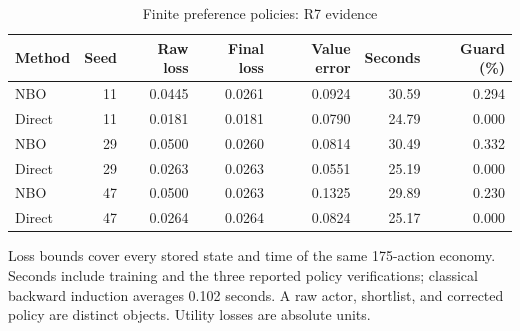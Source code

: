 \begin{table}[htbp]\centering
\caption{Finite preference policies: R7 evidence}
\begin{small}\begin{tabular}{lrrrrrr}
\toprule
Method & Seed & Raw loss & Final loss & Value error & Seconds & Guard (\%) \\
\midrule
NBO & 11 & 0.0445 & 0.0261 & 0.0924 & 30.59 & 0.294 \\
Direct & 11 & 0.0181 & 0.0181 & 0.0790 & 24.79 & 0.000 \\
NBO & 29 & 0.0500 & 0.0260 & 0.0814 & 30.49 & 0.332 \\
Direct & 29 & 0.0263 & 0.0263 & 0.0551 & 25.19 & 0.000 \\
NBO & 47 & 0.0500 & 0.0263 & 0.1325 & 29.89 & 0.230 \\
Direct & 47 & 0.0264 & 0.0264 & 0.0824 & 25.17 & 0.000 \\
\bottomrule\end{tabular}\end{small}
\par\smallskip\begin{minipage}{.96\linewidth}\footnotesize Loss bounds cover every stored state and time of the same 175-action economy. Seconds include training and the three reported policy verifications; classical backward induction averages 0.102 seconds. A raw actor, shortlist, and corrected policy are distinct objects. Utility losses are absolute units.\end{minipage}
\end{table}
